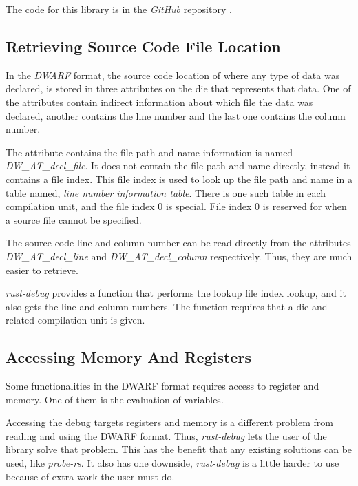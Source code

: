 The code for this library is in the \emph{GitHub} repository \cite{rust-debug}.



\subsection{Retrieving Source Code File Location} \label{sec:decl}
In the \emph{DWARF} format, the source code location of where any type of data was declared, is stored in three attributes on the \gls{die} that represents that data.
One of the attributes contain indirect information about which file the data was declared, another contains the line number and the last one contains the column number.


The attribute contains the file path and name information is named \emph{DW\_AT\_decl\_file}.
It does not contain the file path and name directly, instead it contains a file index.
This file index is used to look up the file path and name in a table named, \emph{line number information table}.
There is one such table in each compilation unit, and the file index $0$ is special.
File index $0$ is reserved for when a source file cannot be specified.


The source code line and column number can be read directly from the attributes \emph{DW\_AT\_decl\_line} and \emph{DW\_AT\_decl\_column} respectively.
Thus, they are much easier to retrieve.


\emph{rust-debug} provides a function that performs the lookup file index lookup, and it also gets the line and column numbers.
The function requires that a \gls{die} and related compilation unit is given.


\subsection{Accessing Memory And Registers}
Some functionalities in the \gls{DWARF} format requires access to register and memory.
One of them is the evaluation of variables.


Accessing the debug targets registers and memory is a different problem from reading and using the \gls{DWARF} format.
Thus, \emph{rust-debug} lets the user of the library solve that problem.
This has the benefit that any existing solutions can be used, like \emph{probe-rs}.
It also has one downside, \emph{rust-debug} is a little harder to use because of extra work the user must do.


